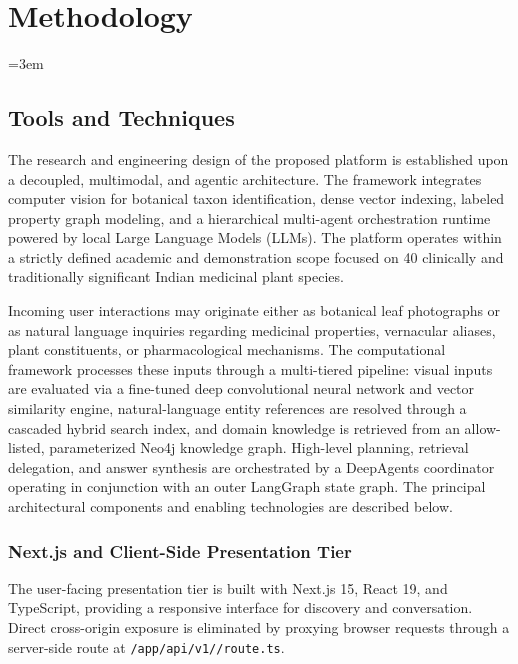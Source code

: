 \chapter{Methodology}
\emergencystretch=3em
\providecommand{\mathbb}[1]{\mathbf{#1}}
\providecommand{\varnothing}{\emptyset}
\providecommand{\operatorname}[1]{\mathrm{#1}}
\providecommand{\text}[1]{\mbox{#1}}

\section{Tools and Techniques}

The research and engineering design of the proposed platform is established upon a decoupled, multimodal, and agentic architecture. The framework integrates computer vision for botanical taxon identification, dense vector indexing, labeled property graph modeling, and a hierarchical multi-agent orchestration runtime powered by local Large Language Models (LLMs). The platform operates within a strictly defined academic and demonstration scope focused on 40 clinically and traditionally significant Indian medicinal plant species. 

Incoming user interactions may originate either as botanical leaf photographs or as natural language inquiries regarding medicinal properties, vernacular aliases, plant constituents, or pharmacological mechanisms. The computational framework processes these inputs through a multi-tiered pipeline: visual inputs are evaluated via a fine-tuned deep convolutional neural network and vector similarity engine, natural-language entity references are resolved through a cascaded hybrid search index, and domain knowledge is retrieved from an allow-listed, parameterized Neo4j knowledge graph. High-level planning, retrieval delegation, and answer synthesis are orchestrated by a DeepAgents coordinator operating in conjunction with an outer LangGraph state graph. The principal architectural components and enabling technologies are described below.

\subsection{Next.js and Client-Side Presentation Tier}

The user-facing presentation tier is built with Next.js 15, React 19, and TypeScript, providing a responsive interface for discovery and conversation. Direct cross-origin exposure is eliminated by proxying browser requests through a server-side route at \texttt{/\allowbreak app/\allowbreak api/\allowbreak v1/\allowbreak [...path]/\allowbreak route.ts}.

